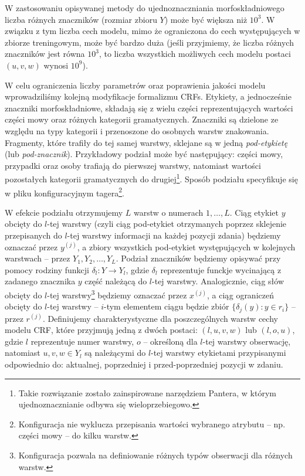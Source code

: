 \documentclass[a4paper,10]{article}
\begin{document}
W zastosowaniu opisywanej metody do ujednoznaczniania
morfoskładniowego liczba różnych znaczników (rozmiar zbioru $Y$)
może być większa niż $10^3$. 
W związku z tym liczba cech modelu, mimo że ograniczona do cech
występujących w zbiorze treningowym, może być bardzo duża (jeśli przyjmiemy,
że liczba różnych znaczników jest równa $10^3$, to liczba wszystkich
możliwych cech modelu postaci $(u, v, w)$ wynosi $10^9$).

W celu ograniczenia liczby parametrów oraz poprawienia jakości modelu
wprowadziliśmy kolejną modyfikacje formalizmu CRFs. Etykiety, a jednocześnie
znaczniki  morfoskładniowe, składają się z wielu części reprezentujących
wartości części mowy oraz różnych kategorii gramatycznych.
Znaczniki są dzielone ze względu na typy kategorii i przenoszone
do osobnych warstw znakowania.
Fragmenty, które trafiły do tej samej warstwy, sklejane są w jedną
\emph{pod-etykietę} (lub \emph{pod-znacznik}).
Przykładowy podział może być następujący:
części mowy, przypadki oraz osoby trafiają do pierwszej warstwy,
natomiast wartości pozostałych kategorii gramatycznych do
drugiej\footnote{Takie rozwiązanie zostało zainspirowane narzędziem Pantera,
w którym ujednoznacznianie odbywa się wieloprzebiegowo.}. 
Sposób podziału specyfikuje się w pliku konfiguracyjnym
tagera\footnote{Konfiguracja nie wyklucza przepisania wartości
wybranego atrybutu -- np. części mowy -- do kilku warstw.}.

W efekcie podziału otrzymujemy $L$ warstw o numerach $1, \ldots, L$.
Ciąg etykiet $y$ obcięty do $l$-tej warstwy
(czyli ciąg pod-etykiet otrzymanych poprzez sklejenie przepisanych do $l$-tej
warstwy informacji na każdej pozycji zdania)
będziemy oznaczać przez $y^{(j)}$, a zbiory wszystkich pod-etykiet występujących
w kolejnych warstwach -- przez $Y_1, Y_2, \ldots, Y_L$.
Podział znaczników będziemy opisywać przy pomocy rodziny funkcji
$\delta_l: Y \rightarrow Y_l$, gdzie $\delta_l$ reprezentuje funckje
wycinającą z zadanego znacznika $y$ część należącą do $l$-tej warstwy.
Analogicznie, ciąg słów obcięty do $l$-tej warstwy\footnote{Konfiguracja pozwala
na definiowanie różnych typów obserwacji dla różnych warstw.} będziemy
oznaczać przez $x^{(j)}$, a ciąg ograniczeń obcięty do $l$-tej warstwy
-- $i$-tym elementem ciągu będzie zbiór $\lbrace \delta_j(y) : y \in
r_i \rbrace$ -- przez $r^{(j)}$.
Definiujemy charakterystyczne dla poszczególnych warstw cechy
modelu CRF, które przyjmują jedną z dwóch postaci:
$(l, u, v, w)$ lub $(l, o, u)$, gdzie $l$
reprezentuje numer warstwy, $o$ -- określoną dla $l$-tej warstwy
obserwację, natomiast $u, v, w \in Y_l$ są należącymi do $l$-tej
warstwy etykietami przypisanymi odpowiednio do:
aktualnej, poprzedniej i przed-poprzedniej pozycji w zdaniu.
\end{document}
